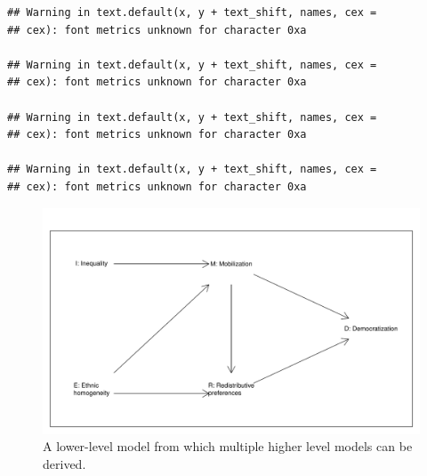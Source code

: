 \documentclass[12pt,]{book}
\begin{document}
\begin{verbatim}
## Warning in text.default(x, y + text_shift, names, cex =
## cex): font metrics unknown for character 0xa

## Warning in text.default(x, y + text_shift, names, cex =
## cex): font metrics unknown for character 0xa

## Warning in text.default(x, y + text_shift, names, cex =
## cex): font metrics unknown for character 0xa

## Warning in text.default(x, y + text_shift, names, cex =
## cex): font metrics unknown for character 0xa
\end{verbatim}

\begin{figure}

{\centering \includegraphics[width=.5\textwidth]{ii_files/figure-latex/lowercomplexdem-1} 

}

\caption{A lower-level model  from which multiple higher level models can be derived.}\label{fig:lowercomplexdem}
\end{figure}
\end{document}

